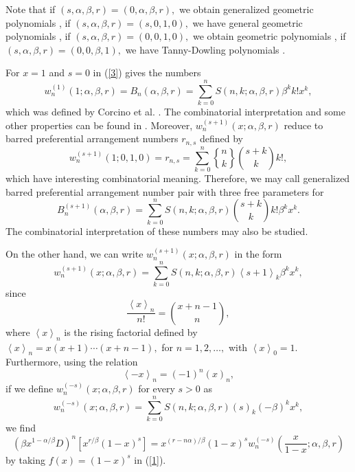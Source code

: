 \documentclass{article}%
\begin{document}
Note that if $\left(  s,\alpha,\beta,r\right)  =\left(  0,\alpha
,\beta,r\right)  ,$ we obtain generalized geometric polynomials \cite{Kargin},
if $\left(  s,\alpha,\beta,r\right)  =\left(  s,0,1,0\right)  ,$ we have
general geometric polynomials \cite{B}, if $\left(  s,\alpha,\beta,r\right)
=\left(  0,0,1,0\right)  ,$ we obtain geometric polynomials \cite{B}, if
$\left(  s,\alpha,\beta,r\right)  =\left(  0,0,\beta,1\right)  ,$ we have
Tanny-Dowling polynomials \cite{Benoumhani2}.

For $x=1$ and $s=0$ in (\ref{3}) gives the numbers%
\[
w_{n}^{\left(  1\right)  }\left(  1;\alpha,\beta,r\right)  =B_{n}\left(
\alpha,\beta,r\right)  =\sum_{k=0}^{n}S\left(  n,k;\alpha,\beta,r\right)
\beta^{k}k!x^{k},
\]
which was defined by Corcino et al. \cite{Corcino6}. The combinatorial
interpretation and some other properties can be found in \cite{Corcino6,
Corcino4}. Moreover, $w_{n}^{\left(  s+1\right)  }\left(  x;\alpha
,\beta,r\right)  $ reduce to barred preferential arrangement numbers $r_{n,s}$
defined by \cite{Albach, B}%
\[
w_{n}^{\left(  s+1\right)  }\left(  1;0,1,0\right)  =r_{n,s}=\sum_{k=0}^{n}%
\genfrac{\{}{\}}{0pt}{}{n}{k}%
\binom{s+k}{k}k!,
\]
which have interesting combinatorial meaning. Therefore, we may call
generalized barred preferential arrangement number pair with three free
parameters for
\[
B_{n}^{\left(  s+1\right)  }\left(  \alpha,\beta,r\right)  =\sum_{k=0}%
^{n}S\left(  n,k;\alpha,\beta,r\right)  \binom{s+k}{k}k!\beta^{k}x^{k}.
\]
The combinatorial interpretation of these numbers may also be studied.

On the other hand, we can write $w_{n}^{\left(  s+1\right)  }\left(
x;\alpha,\beta,r\right)  $ in the form%
\[
w_{n}^{\left(  s+1\right)  }\left(  x;\alpha,\beta,r\right)  =\sum_{k=0}%
^{n}S\left(  n,k;\alpha,\beta,r\right)  \left\langle s+1\right\rangle
_{k}\beta^{k}x^{k},
\]
since
\[
\frac{\left\langle x\right\rangle _{n}}{n!}=\binom{x+n-1}{n},
\]
where $\left\langle x\right\rangle _{n}$ is the rising factorial defined by
$\left\langle x\right\rangle _{n}=x\left(  x+1\right)  \cdots\left(
x+n-1\right)  ,$ for $n=1,2,\ldots,$ with $\left\langle x\right\rangle
_{0}=1.$\textbf{ }Furthermore, using the relation
\begin{equation}
\left\langle -x\right\rangle _{n}=\left(  -1\right)  ^{n}\left(  x\right)
_{n}, \label{36}%
\end{equation}
if we define $w_{n}^{\left(  -s\right)  }\left(  x;\alpha,\beta,r\right)  $
for every $s>0$ as
\[
w_{n}^{\left(  -s\right)  }\left(  x;\alpha,\beta,r\right)  =\sum_{k=0}%
^{n}S\left(  n,k;\alpha,\beta,r\right)  \left(  s\right)  _{k}\left(
-\beta\right)  ^{k}x^{k},
\]
we find
\begin{equation}
\left(  \beta x^{1-\alpha/\beta}D\right)  ^{n}\left[  x^{r/\beta}\left(
1-x\right)  ^{s}\right]  =x^{\left(  r-n\alpha\right)  /\beta}\left(
1-x\right)  ^{s}w_{n}^{\left(  -s\right)  }\left(  \frac{x}{1-x};\alpha
,\beta,r\right)  \label{38}%
\end{equation}
by taking $f\left(  x\right)  =\left(  1-x\right)  ^{s}$ in (\ref{1}).
\end{document}
